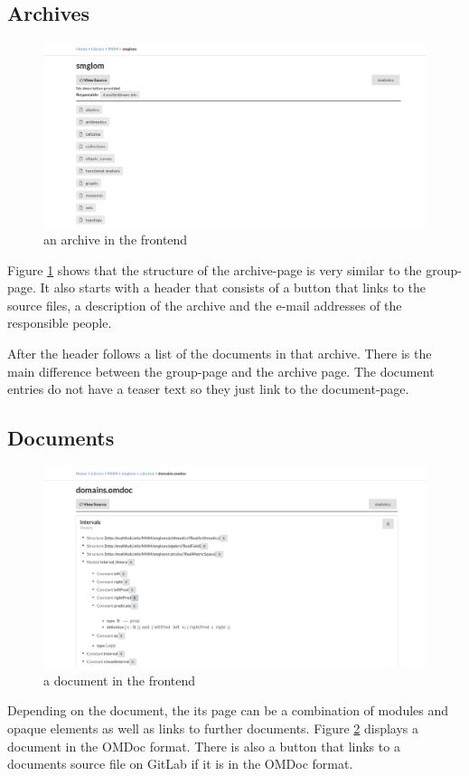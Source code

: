 \documentclass[11pt,a4paper]{article}
\begin{document}
\subsection{Archives}
\begin{figure}[H]
\includegraphics[width=1\textwidth]{archive.png}
\caption{ an archive in the frontend}
\label{fig:archive}
\end{figure}
Figure \ref{fig:archive} shows that the structure of the archive-page is very similar to the group-page.
It also starts with a header that consists of a button that links to the source files, a description of the archive and the e-mail addresses of the responsible people. 

After the header follows a list of the documents in that archive.
There is the main difference between the group-page and the archive page.
The document entries do not have a teaser text so they just link to the document-page.

\subsection{Documents}
\begin{figure}[H]
\includegraphics[width=1\textwidth]{document.png}
\caption{a document in the frontend}
\label{fig:doc}
\end{figure}
Depending on the document, the its page can be a combination of modules and opaque elements as well as links to further documents.
Figure \ref{fig:doc} displays a document in the OMDoc format.
There is also a button that links to a documents source file on GitLab if it is in the OMDoc format.
\end{document}
